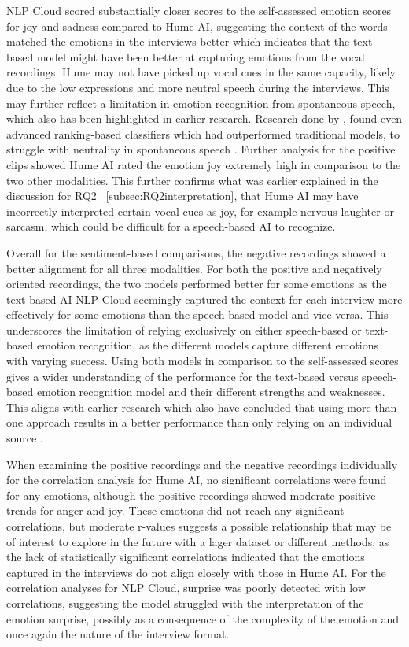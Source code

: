 NLP Cloud scored substantially closer scores to the self-assessed emotion scores for joy and sadness compared to Hume AI, suggesting the context of the words matched the emotions in the interviews better which indicates that the text-based model might have been better at capturing emotions from the vocal recordings. Hume may not have picked up vocal cues in the same capacity, likely due to the low expressions and more neutral speech during the interviews. This may further reflect a limitation in emotion recognition from spontaneous speech, which also has been highlighted in earlier research. Research done by \textcite{Cao2015}, found even advanced ranking-based classifiers which had outperformed traditional models, to struggle with neutrality in spontaneous speech \autocite{Cao2015}.
Further analysis for the positive clips showed Hume AI rated the emotion joy extremely high in comparison to the two other modalities. This further confirms what was earlier explained in the discussion for RQ2 ~\ref{subsec:RQ2interpretation}, that Hume AI may have incorrectly interpreted certain vocal cues as joy, for example nervous laughter or sarcasm, which could be difficult for a speech-based AI to recognize.

Overall for the sentiment-based comparisons, the negative recordings showed a better alignment for all three modalities. For both the positive and negatively oriented recordings, the two models performed better for some emotions as the text-based AI NLP Cloud seemingly captured the context for each interview more effectively for some emotions than the speech-based model and vice versa. This underscores the limitation of relying exclusively on either speech-based or text-based emotion recognition, as the different models capture different emotions with varying success. Using both models in comparison to the self-assessed scores gives a wider understanding of the performance for the text-based versus speech-based emotion recognition model and their different strengths and weaknesses. This aligns with earlier research which also have concluded that using more than one approach results in a better performance than only relying on an individual source \autocite{Cao2015}.

When examining the positive recordings and the negative recordings individually for the correlation analysis for Hume AI, no significant correlations were found for any emotions, although the positive recordings showed moderate positive trends for anger and joy. These emotions did not reach any significant correlations, but moderate r-values suggests a possible relationship that may be of interest to explore in the future with a lager dataset or different methods, as the lack of statistically significant correlations indicated that the emotions captured in the interviews do not align closely with those in Hume AI. 
For the correlation analyses for NLP Cloud, surprise was poorly detected with low correlations, suggesting the model struggled with the interpretation of the emotion surprise, possibly as a consequence of the complexity of the emotion and once again the nature of the interview format.

